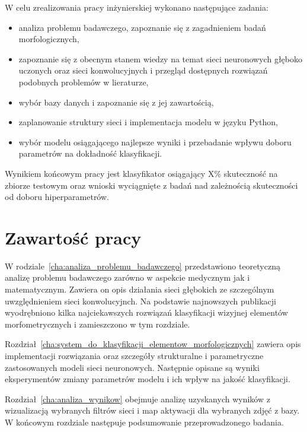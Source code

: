 {\parindent0pt %
W celu zrealizowania pracy inżynierskiej wykonano następujące zadania:
}
\begin{itemize}
\item analiza problemu badawczego, zapoznanie się z zagadnieniem badań morfologicznych,
\item zapoznanie się z obecnym stanem wiedzy na temat sieci neuronowych głęboko uczonych oraz sieci konwolucyjnych i przegląd dostępnych rozwiązań podobnych problemów w lieraturze,
\item wybór bazy danych i zapoznanie się z jej zawartością,
\item zaplanowanie struktury sieci i implementacja modelu w języku Python,
\item wybór modelu osiągającego najlepsze wyniki i przebadanie wpływu doboru parametrów na dokładność klasyfikacji.
\end{itemize}

{\parindent0pt %
Wynikiem końcowym pracy jest klasyfikator osiągający X\% skuteczność na zbiorze testowym oraz wnioski wyciągnięte z badań nad zależnością skuteczności od doboru hiperparametrów.
}
\section{Zawartość pracy}
\label{sec:zawartosc_pracy}

W rodziale~\ref{cha:analiza_problemu_badawczego} przedstawiono teoretyczną analizę problemu badawczego zarówno w aspekcie medycznym jak i matematycznym. Zawiera on opis działania sieci głębokich ze szczególnym uwzględnieniem sieci konwolucyjnch. Na podstawie najnowszych publikacji wyodrębniono kilka najciekawszych rozwiązań klasyfikacji wizyjnej elementów morfometrycznych i zamieszczono w tym rozdziale.

{\parindent0pt %
Rozdział~\ref{cha:system_do_klasyfikacji_elementow_morfologicznych} zawiera opis implementacji rozwiązania oraz szczegóły strukturalne i parametryczne zastosowanych modeli sieci neuronowych. Następnie opisane są wyniki eksperymentów zmiany parametrów modelu i ich wpływ na jakość klasyfikacji.

Rozdział~\ref{cha:analiza_wynikow} obejmuje analizę uzyskanych wyników z wizualizacją wybranych filtrów sieci i map aktywacji dla wybranych zdjęć z bazy. W końcowym rozdziale następuje podsumowanie przeprowadzonego badania.
}